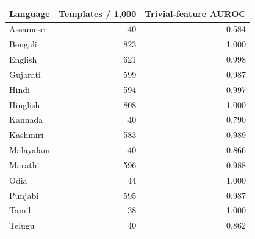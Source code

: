 \begin{tabular}{lrr}
\toprule
Language & Templates / 1,000 & Trivial-feature AUROC \\
\midrule
Assamese & 40 & 0.584 \\
Bengali & 823 & 1.000 \\
English & 621 & 0.998 \\
Gujarati & 599 & 0.987 \\
Hindi & 594 & 0.997 \\
Hinglish & 808 & 1.000 \\
Kannada & 40 & 0.790 \\
Kashmiri & 583 & 0.989 \\
Malayalam & 40 & 0.866 \\
Marathi & 596 & 0.988 \\
Odia & 44 & 1.000 \\
Punjabi & 595 & 0.987 \\
Tamil & 38 & 1.000 \\
Telugu & 40 & 0.862 \\
\bottomrule
\end{tabular}
